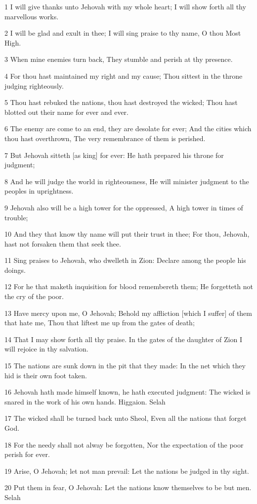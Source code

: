 \par 1 I will give thanks unto Jehovah with my whole heart; I will show forth all thy marvellous works.
\par 2 I will be glad and exult in thee; I will sing praise to thy name, O thou Most High.
\par 3 When mine enemies turn back, They stumble and perish at thy presence.
\par 4 For thou hast maintained my right and my cause; Thou sittest in the throne judging righteously.
\par 5 Thou hast rebuked the nations, thou hast destroyed the wicked; Thou hast blotted out their name for ever and ever.
\par 6 The enemy are come to an end, they are desolate for ever; And the cities which thou hast overthrown, The very remembrance of them is perished.
\par 7 But Jehovah sitteth [as king] for ever: He hath prepared his throne for judgment;
\par 8 And he will judge the world in righteousness, He will minister judgment to the peoples in uprightness.
\par 9 Jehovah also will be a high tower for the oppressed, A high tower in times of trouble;
\par 10 And they that know thy name will put their trust in thee; For thou, Jehovah, hast not forsaken them that seek thee.
\par 11 Sing praises to Jehovah, who dwelleth in Zion: Declare among the people his doings.
\par 12 For he that maketh inquisition for blood remembereth them; He forgetteth not the cry of the poor.
\par 13 Have mercy upon me, O Jehovah; Behold my affliction [which I suffer] of them that hate me, Thou that liftest me up from the gates of death;
\par 14 That I may show forth all thy praise. In the gates of the daughter of Zion I will rejoice in thy salvation.
\par 15 The nations are sunk down in the pit that they made: In the net which they hid is their own foot taken.
\par 16 Jehovah hath made himself known, he hath executed judgment: The wicked is snared in the work of his own hands. Higgaion. Selah
\par 17 The wicked shall be turned back unto Sheol, Even all the nations that forget God.
\par 18 For the needy shall not alway be forgotten, Nor the expectation of the poor perish for ever.
\par 19 Arise, O Jehovah; let not man prevail: Let the nations be judged in thy sight.
\par 20 Put them in fear, O Jehovah: Let the nations know themselves to be but men. Selah

